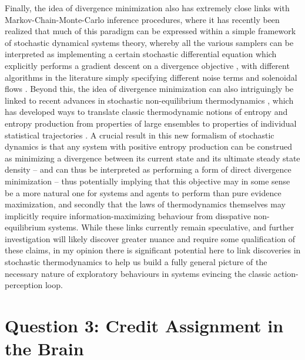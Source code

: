 Finally, the idea of divergence minimization also has extremely close links with Markov-Chain-Monte-Carlo inference procedures, where it has recently been realized that much of this paradigm can be expressed within a simple framework of stochastic dynamical systems theory, whereby all the various samplers can be interpreted as implementing a certain stochastic differential equation which explicitly performs a gradient descent on a divergence objective \citep{ma2015complete}, with different algorithms in the literature simply specifying different noise terms and solenoidal flows \citep{yuan2017sde}. Beyond this, the idea of divergence minimization can also intriguingly be linked to recent advances in stochastic non-equilibrium thermodynamics \citep{seifert2012stochastic}, which has developed ways to translate classic thermodynamic notions of entropy and entropy production from properties of large ensembles to properties of individual statistical trajectories \citep{esposito2010three1}. A crucial result in this new formalism of stochastic dynamics is that any system with positive entropy production can be construed as minimizing a divergence between its current state and its ultimate steady state density \citep{esposito2010three1} -- and can thus be interpreted as performing a form of direct divergence minimization -- thus potentially implying that this objective may in some sense be a more natural one for systems and agents to perform than pure evidence maximization, and secondly that the laws of thermodynamics themselves may implicitly require information-maximizing behaviour from disspative non-equilibrium systems. While these links currently remain speculative, and further investigation will likely discover greater nuance and require some qualification of these claims, in my opinion there is significant potential here to link discoveries in stochastic thermodynamics to help us build a fully general picture of the necessary nature of exploratory behaviours in systems evincing the classic action-perception loop.

\section{Question 3: Credit Assignment in the Brain}

